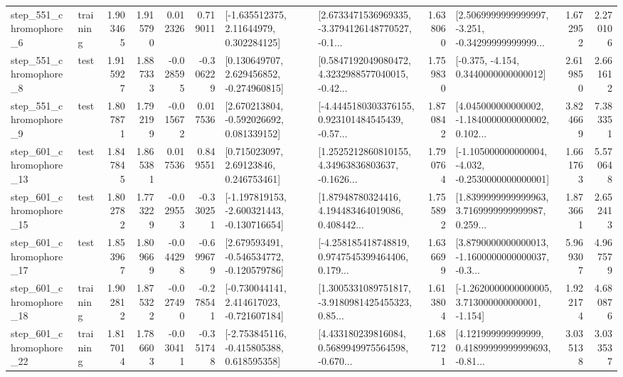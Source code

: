\begin{tabular}{llrrrrllrlrr}
   step\_551\_chromophore\_6 &  training &      1.903465 &    1.915790 &      0.012326 &  0.719011 &     [-1.635512375, 2.11644979, 0.302284125] &  [2.6733471536969335, -3.3794126148770527, -0.1... &       1.638060 &  [2.5069999999999997, -3.251, -0.34299999999999... &            1.672952 &          2.270106 \\
   step\_551\_chromophore\_8 &      test &      1.915927 &    1.887333 &     -0.028595 & -0.306229 &    [0.130649707, 2.629456852, -0.274960815] &  [0.5847192049080472, 4.3232988577040015, -0.42... &       1.759830 &               [-0.375, -4.154, 0.3440000000000012] &            2.619850 &          2.661612 \\
   step\_551\_chromophore\_9 &      test &      1.807871 &    1.792199 &     -0.015672 &  0.017536 &    [2.670213804, -0.592026692, 0.081339152] &  [-4.4445180303376155, 0.923101484545439, -0.57... &       1.870842 &  [4.045000000000002, -1.1840000000000002, 0.102... &            3.824669 &          7.383351 \\
  step\_601\_chromophore\_13 &      test &      1.847845 &    1.865381 &      0.017536 &  0.849551 &      [0.715023097, 2.69123846, 0.246753461] &  [1.2525212860810155, 4.34963836803637, -0.1626... &       1.790764 &  [-1.105000000000004, -4.032, -0.2530000000000001] &            1.661763 &          5.570648 \\
  step\_601\_chromophore\_15 &      test &      1.802782 &    1.773229 &     -0.029553 & -0.330251 &  [-1.197819153, -2.600321443, -0.130716654] &  [1.87948780324416, 4.194483464019086, 0.408442... &       1.755892 &  [1.8399999999999963, 3.7169999999999987, 0.259... &            1.873661 &          2.652413 \\
  step\_601\_chromophore\_17 &      test &      1.853967 &    1.809669 &     -0.044298 & -0.699679 &   [2.679593491, -0.546534772, -0.120579786] &  [-4.258185418748819, 0.9747545399464406, 0.179... &       1.636699 &  [3.8790000000000013, -1.1600000000000037, -0.3... &            5.969307 &          4.967579 \\
  step\_601\_chromophore\_18 &  training &      1.902812 &    1.875322 &     -0.027490 & -0.278541 &   [-0.730044141, 2.414617023, -0.721607184] &  [1.3005331089751817, -3.9180981425455323, 0.85... &       1.613804 &   [-1.2620000000000005, 3.713000000000001, -1.154] &            1.922174 &          4.680876 \\
  step\_601\_chromophore\_22 &  training &      1.817014 &    1.786603 &     -0.030411 & -0.351748 &   [-2.753845116, -0.415805388, 0.618595358] &  [4.433180239816084, 0.5689949975564598, -0.670... &       1.687121 &  [4.121999999999999, 0.41899999999999693, -0.81... &            3.035138 &          3.033537 \\

\end{tabular}
